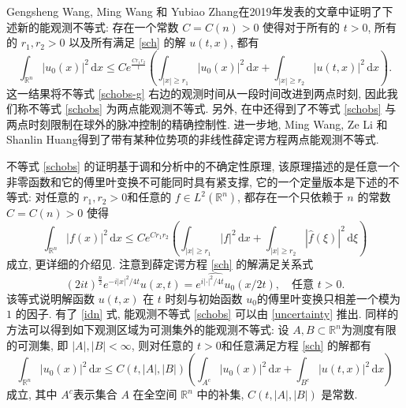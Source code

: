 \documentclass[master]{cugthesis}
\newcommand\R{\ensuremath{\mathbb{R}}}
\renewcommand\d{\ensuremath{\,\mathrm{d}}}
\begin{document}
     Gengsheng Wang, Ming Wang 和 Yubiao Zhang在2019年发表的文章\cite{Wang2019ObservabilityAU}中证明了下述新的能观测不等式: 存在一个常数 $C=C(n)>0$ 使得对于所有的 $t>0$, 所有的 $r_1,r_2>0$ 以及所有满足 \eqref{sch} 的解 $u(t,x)$, 都有
    \begin{equation}
        \int_{\R^n}|u_0(x)|^2\d x\le C e^{\frac{Cr_1r_2}{t}}\left(\int_{|x|\ge r_1}|u_0(x)|^2\d x+\int_{|x|\ge r_2}|u(t,x)|^2\d x\right).\label{schobs}
    \end{equation}这一结果将不等式 \eqref{schobs-g} 右边的观测时间从一段时间改进到两点时刻,    因此我们称不等式 \eqref{schobs} 为两点能观测不等式. 另外, 在\cite[5.2节]{Wang2019ObservabilityAU}中还得到了不等式 \eqref{schobs} 与两点时刻限制在球外的脉冲控制的精确控制性. 进一步地, Ming Wang, Ze Li 和 Shanlin Huang\cite{Wang2021Indiana}得到了带有某种位势项的非线性薛定谔方程两点能观测不等式.
    
    不等式 \eqref{schobs} 的证明基于调和分析中的不确定性原理, 该原理描述的是任意一个非零函数和它的傅里叶变换不可能同时具有紧支撑, 它的一个定量版本是下述的不等式: 对任意的 $r_1,r_2>0$和任意的 $f\in L^2(\R^n)$, 都存在一个只依赖于 $n$ 的常数 $C=C(n)>0$ 使得
    \begin{equation}
        \int_{\R^n}|f(x)|^2\d x\le C e^{Cr_1r_2}\left(\int_{|x|\ge r_1}|f|^2\d x+\int_{|x|\ge r_2}|\widehat{f}(\xi)|^2\d \xi\right)\label{uncertainty}
    \end{equation}
    成立, 更详细的介绍见\cite{Havin2012, Jaming2007NazarovsUP,Nazarov1993}. 注意到薛定谔方程 \eqref{sch} 的解满足关系式\cite{Linares2014Ponce}
    \begin{equation}
        (2it)^{\frac{n}{2}}e^{-i|x|^2 / 4t} u(x,t) = \widehat{e^{i|\cdot|^2 /4t}u_0}(x /2t), \quad\text{任意 }t>0.\label{idn}
    \end{equation}
    该等式说明解函数 $u(t,x)$ 在 $t$ 时刻与初始函数 $u_0$的傅里叶变换只相差一个模为 $1$ 的因子. 有了 \eqref{idn} 式, 能观测不等式 \eqref{schobs} 可以由 \eqref{uncertainty} 推出. 同样的方法可以得到如下观测区域为可测集外的能观测不等式: 设 $A,B\subset \R^n$为测度有限的可测集, 即 $|A|,|B|<\infty$, 则对任意的 $t>0$和任意满足方程 \eqref{sch} 的解都有
    \begin{equation}
        \int_{\R^n}|u_0(x)|^2\d x\le C(t,|A|,|B|)\left(\int_{A^c}|u_0(x)|^2\d x+\int_{B^c}|u(t,x)|^2\d x\right)\label{schobs-2}
    \end{equation}
    成立, 其中 $A^c$表示集合 $A$ 在全空间 $\R^n$ 中的补集, $C(t,|A|,|B|)$ 是常数.
    
\end{document}
